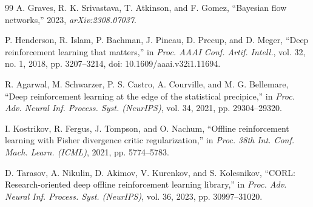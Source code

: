 \documentclass[journal]{IEEEtran}
\begin{document}
\begin{thebibliography}{99}
A. Graves, R. K. Srivastava, T. Atkinson, and F. Gomez, ``Bayesian flow networks,'' 2023, \emph{arXiv:2308.07037}.

P. Henderson, R. Islam, P. Bachman, J. Pineau, D. Precup, and D. Meger, ``Deep reinforcement learning that matters,'' in \emph{Proc. AAAI Conf. Artif. Intell.}, vol. 32, no. 1, 2018, pp. 3207--3214, doi: 10.1609/aaai.v32i1.11694.

R. Agarwal, M. Schwarzer, P. S. Castro, A. Courville, and M. G. Bellemare, ``Deep reinforcement learning at the edge of the statistical precipice,'' in \emph{Proc. Adv. Neural Inf. Process. Syst. (NeurIPS)}, vol. 34, 2021, pp. 29304--29320.

I. Kostrikov, R. Fergus, J. Tompson, and O. Nachum, ``Offline reinforcement learning with Fisher divergence critic regularization,'' in \emph{Proc. 38th Int. Conf. Mach. Learn. (ICML)}, 2021, pp. 5774--5783.

D. Tarasov, A. Nikulin, D. Akimov, V. Kurenkov, and S. Kolesnikov, ``CORL: Research-oriented deep offline reinforcement learning library,'' in \emph{Proc. Adv. Neural Inf. Process. Syst. (NeurIPS)}, vol. 36, 2023, pp. 30997--31020.

\end{thebibliography}
\end{document}

